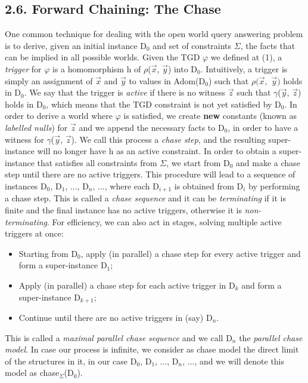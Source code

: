 \documentclass[11pt, a4paper, dvipsnames]{article}
\begin{document}
\subsection{2.6. Forward Chaining: The Chase}
One common technique for dealing with the open world query answering problem is to derive, given an initial instance D$_{0}$ and set of constraints $\Sigma$, the facts that can be implied in all possible worlds.\newline
Given the TGD $\varphi$ we defined at (1), a \textit{trigger} for $\varphi$ is a  homomorphism h of $\rho$($\vec{x}$, $\vec{y}$) into D$_{0}$. Intuitively, a trigger is simply an assignment of $\vec{x}$ and $\vec{y}$ to values in Adom(D$_{0}$) such that $\rho(\vec{x},$ $\vec{y})$ holds in D$_{0}$. We say that the trigger is \textit{active} if there is no witness $\vec{z}$ such that $\gamma$($\vec{y}$, $\vec{z}$) holds in D$_{0}$, which means that the TGD constraint is not yet satisfied by D$_{0}$.\newline
In order to derive a world where $\varphi$ is satisfied, we create \textbf{new} constants (known as \textit{labelled nulls}) for $\vec{z}$ and we append the necessary facts to D$_{0}$, in order to have a witness for $\gamma$($\vec{y}$, $\vec{z}$). We call this process a \textit{chase step}, and the resulting super-instance will no longer have h as an active constraint. In order to obtain a super-instance that satisfies all constraints from $\Sigma$, we start from D$_{0}$ and make a chase step until there are no active triggers. This procedure will lead to a sequence of instances D$_{0}$, D$_{1}$, ..., D$_{n}$, ..., where each D$_{i+1}$ is obtained from D$_{i}$ by performing a chase step. This is called a \textit{chase sequence} and it can be \textit{terminating} if it is finite and the final instance has no active triggers, otherwise it is \textit{non-terminating}.\newline
For efficiency, we can also act in stages, solving multiple active triggers at once:
\begin{itemize}
	\item Starting from D$_{0}$, apply (in parallel) a chase step for every active trigger and form a super-instance D$_{1}$;
	\item Apply (in parallel) a chase step for each active trigger in D$_{k}$ and form a super-instance D$_{k+1}$;
	\item Continue until there are no active triggers in (say) D$_{n}$.
\end{itemize}
This is called a \textit{maximal parallel chase sequence} and we call D$_{n}$ the \textit{parallel chase model}. In case our process is infinite, we consider as chase model the direct limit of the structures in it, in our case D$_{0}$, D$_{1}$, ..., D$_{n}$, ..., and we will denote this model as chase$_{\Sigma}$(D$_{0}$).\newline
\end{document}
